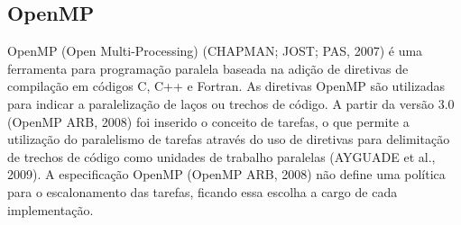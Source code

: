 \subsection{OpenMP}

OpenMP (Open Multi-Processing) (CHAPMAN; JOST; PAS, 2007) é uma ferramenta para programação paralela baseada na adição de diretivas de compilação em códigos C, C++ e Fortran. As diretivas OpenMP são utilizadas para indicar a paralelização de laços ou trechos de código. A partir da versão 3.0 (OpenMP ARB, 2008) foi inserido o conceito de tarefas, o que permite a utilização do paralelismo de tarefas através do uso de diretivas para delimitação de trechos de código como unidades de trabalho paralelas (AYGUADE et al., 2009). A especificação OpenMP (OpenMP ARB, 2008) não define uma política para o escalonamento das tarefas, ficando essa escolha a cargo de cada implementação.
